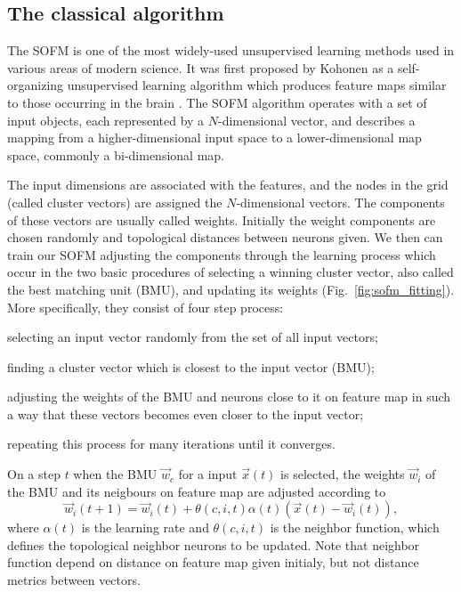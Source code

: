 \documentclass[pra,showkeys,twocolumn,showpacs]{revtex4-1}
\begin{document}
\subsection{The classical algorithm}


The SOFM is one of the most widely-used unsupervised learning methods used in various areas of modern science. 
It was first proposed by Kohonen as a self-organizing unsupervised learning algorithm which produces feature maps similar to those occurring in the brain \cite{solan2001}. 
The SOFM algorithm operates with a set of input objects, each represented by a $N$-dimensional vector, 
and describes a mapping from a higher-dimensional input space to a lower-dimensional map space, commonly a bi-dimensional map.

The input dimensions are associated with the features, 
and the nodes in the grid (called cluster vectors) are assigned the $N$-dimensional vectors. 
The components of these vectors are usually called weights. 
Initially the weight components are chosen randomly 
and topological distances between neurons given. 
We then can train our SOFM adjusting the components through the learning process which occur in the two basic procedures of 
selecting a winning cluster vector, also called the best matching unit (BMU), and updating its weights (Fig.~\ref{fig:sofm_fitting}). 
More specifically, they consist of four step process: 
\begin{enumerate*}
\item selecting an input vector randomly from the set of all input vectors; 
\item finding a cluster vector which is closest to the input vector (BMU); 
\item adjusting the weights of the BMU and neurons close to it on feature map in such a way 
	that these vectors  becomes even closer to the input vector; 
\item repeating this process for many iterations until it converges.
\end{enumerate*}


On a step $t$ when the BMU $\vec{w}_{c}$ for a input $\vec{x}(t)$ is selected, 
the weights $\vec{w}_{i}$ of the BMU and its neigbours on feature map are adjusted according to
%
\begin{equation}
    \label{eq:learning}
	\vec{w}_{i}(t + 1) 
	= \vec{w}_{i}(t)
	+ \theta(c, i, t) \alpha(t) 
		\left(\vec{x}(t) - \vec{w}_{i}(t)\right) ,
\end{equation}
%
where  $\alpha(t)$ is the learning rate and $\theta(c, i, t)$ is the neighbor function,
which defines the topological neighbor neurons to be updated. 
Note that neighbor function depend on distance on feature map given initialy, 
but not distance metrics between vectors. 
\end{document}

